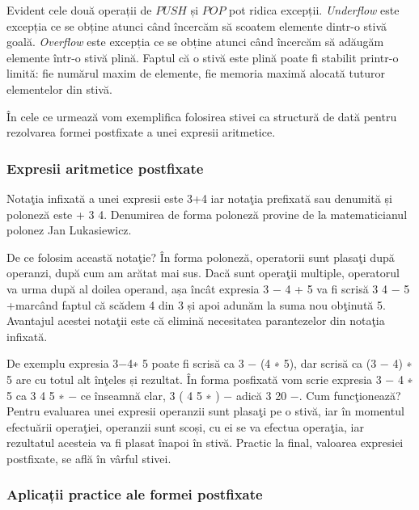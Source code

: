 Evident cele două operații de $PUSH$ și $POP$ pot ridica excepții.
\textit{Underflow} este excepția ce se obține atunci când încercăm să scoatem elemente dintr-o stivă goală.
\textit{Overflow} este excepția ce se obține atunci când încercăm să adăugăm elemente într-o stivă plină. Faptul că o stivă este plină poate fi stabilit printr-o limită: fie numărul maxim de elemente, fie memoria maximă alocată tuturor elementelor din stivă.


În cele ce urmează vom exemplifica folosirea stivei ca structură de dată pentru rezolvarea formei postfixate a unei expresii aritmetice.

\subsubsection{Expresii aritmetice postfixate}

Notaţia infixată a unei expresii este 3+4 iar notaţia prefixată sau denumită și poloneză este + 3 4. Denumirea de forma poloneză provine de la matematicianul polonez Jan Lukasiewicz. 

De ce folosim această notaţie? În forma poloneză, operatorii sunt plasaţi după operanzi, după cum am arătat mai sus. Dacă sunt operaţii multiple, operatorul va urma după al doilea operand, așa încât expresia 3 − 4 + 5 va fi scrisă 3 4 − 5 +marcând faptul că scădem 4 din 3 și apoi adunăm la suma nou obţinută 5. Avantajul acestei notaţii este că elimină necesitatea parantezelor din notaţia infixată. 

De exemplu expresia 3−4∗ 5 poate fi scrisă ca 3 − (4 ∗ 5), dar scrisă ca (3 − 4) ∗ 5 are cu totul alt înţeles și rezultat. În forma posfixată vom scrie expresia 3 − 4 ∗ 5 ca 3 4 5 ∗ − ce înseamnă clar, 3 ( 4 5 ∗ ) −
adică 3 20 −.
Cum funcţionează? Pentru evaluarea unei expresii operanzii sunt plasaţi pe o stivă, iar în
momentul efectuării operaţiei, operanzii sunt scoși, cu ei se va efectua operaţia, iar rezultatul acesteia va fi plasat înapoi în stivă. Practic la final, valoarea expresiei postfixate, se află în vârful stivei.

\subsubsection{Aplicații practice ale formei postfixate}

